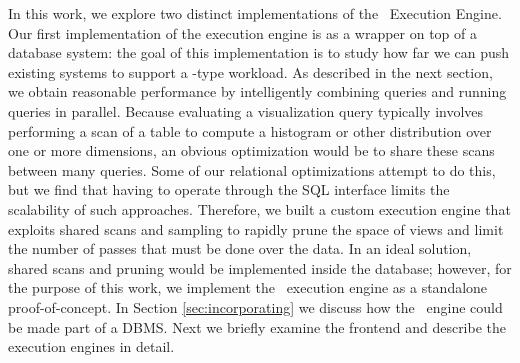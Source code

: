 In this work, we explore two distinct implementations of the \VizRecDB\ Execution
Engine. 
Our first implementation of the execution engine is as a wrapper on top of a database
system: the goal of this implementation is to study how far we can 
push existing systems to support a \VizRecDB-type workload.
As described in the next section, we obtain reasonable performance by
intelligently combining queries and running queries in parallel. 
Because evaluating a visualization query typically involves 
performing a scan of a table to compute  a histogram or other distribution 
over one or more dimensions, an obvious optimization would be to share 
these scans between many queries.  
Some of our relational optimizations attempt to do this, 
but we find that having to operate through the SQL interface 
limits the scalability of such approaches.  
Therefore, we built a custom execution engine that exploits 
shared scans and sampling to rapidly prune the space of views and 
limit the number of passes that must be done over the data.
In an ideal solution, shared scans and pruning would be implemented inside the
database; however, for the purpose of this work, we implement the \VizRecDB\
execution engine as a standalone proof-of-concept. 
In Section \ref{sec:incorporating} we discuss how the \VizRecDB\ engine could be
made part of a DBMS.
Next we briefly examine the \VizRecDB frontend and describe the execution engines
in detail.


% 


